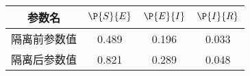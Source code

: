 \begin{tabular}{cccc}
\hline
参数名&$\P{S}{E}$&$\P{E}{I}$&$\P{I}{R}$\\
\hline
隔离前参数值&0.489&0.196&0.033\\
隔离后参数值&0.821&0.289&0.048\\
\hline
\end{tabular}